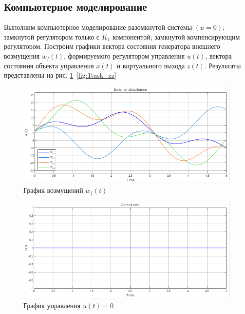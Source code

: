 \documentclass[a4paper, 12pt]{article}
\begin{document}
    \subsection{Компьютерное моделирование}
    Выполним компьютерное моделирование разомкнутой системы $\left( u=0 \right)$;
    замкнутой регулятором только с $K_1$ компонентой; замкнутой компенсирующим регулятором.
    Построим графики вектора состояния генератора внешнего возмущения
    $ w_f(t)$, формируемого регулятором управления $u(t)$, вектора состояния объекта управления
    $x(t)$ и виртуального выхода $z(t)$.
    Результаты представлены на рис. \ref{fig:1task_wf}--\ref{fig:1task_zz}
    \begin{figure}[H]
        \centering
        \includegraphics[scale=0.75]{1task_wf.png}
        \captionsetup{skip=0pt}
        \caption{График возмущений $ w_f(t)$}
        \label{fig:1task_wf}
    \end{figure}
    \begin{figure}[H]
        \centering
        \includegraphics[scale=0.75]{1task_unull_u.png}
        \captionsetup{skip=0pt}
        \caption{График управления $u(t)=0$}
        \label{fig:1task_unull_u}
    \end{figure}
\end{document}
